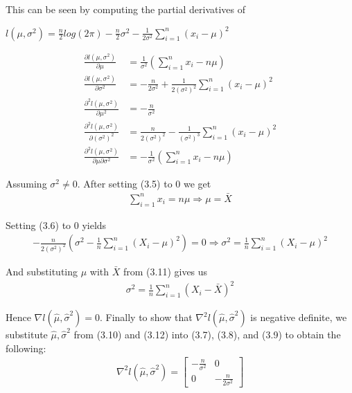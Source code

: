 \documentclass[paper=a4, fontsize=11pt]{scrartcl} %
\numberwithin{equation}{section} %
\numberwithin{figure}{section} %
\numberwithin{table}{section} %
\begin{document}
This can be seen by computing the partial derivatives of 

$ l(\mu, \sigma^2) = \frac{n}{2}log(2\pi)-\frac{n}{2}\sigma^2-\frac{1}{2\sigma^2}\sum_{i=1}^{n}(x_i-\mu)^2$

\begin{align}
\frac{\partial l(\mu, \sigma^2)}{\partial \mu} &= \frac{1}{\sigma^2}\left(\sum_{i=1}^{n}x_i-n\mu\right) \\
\frac{\partial l(\mu, \sigma^2)}{\partial \sigma^2} &= -\frac{n}{2\sigma^2}+\frac{1}{2(\sigma^2)^2}\sum_{i=1}^{n}\left(x_i-\mu\right)^2\\
\frac{\partial^2 l(\mu, \sigma^2)}{\partial \mu^2} &= -\frac{n}{\sigma^2}\\
\frac{\partial^2 l(\mu, \sigma^2)}{\partial (\sigma^2)^2} &= \frac{n}{2(\sigma^2)^2}-\frac{1}{(\sigma^2)^3}\sum_{i=1}^{n}\left(x_i-\mu\right)^2\\
\frac{\partial^2 l(\mu, \sigma^2)}{\partial \mu \partial \sigma^2} &= -\frac{1}{\sigma^2}\left(\sum_{i=1}^{n}x_i-n\mu\right)
\end{align}

Assuming $\sigma^2 \ne 0$. After setting (3.5) to 0 we get
\begin{align}
\sum_{i=1}^{n}x_i=n\mu \Rightarrow \mu = \bar{X}
\end{align}

Setting (3.6) to 0 yields
\begin{align}
-\frac{n}{2(\sigma^2)^2}\left(\sigma^2-\frac{1}{n}\sum_{i=1}^{n}\left(X_i-\mu\right)^2 \right) = 0  
 \Rightarrow \sigma^2 = \frac{1}{n}\sum_{i=1}^{n}\left(X_i-\mu\right)^2
\end{align}

And substituting $\mu$ with $\bar{X}$ from (3.11) gives us 
\begin{align}
\sigma^2 = \frac{1}{n}\sum_{i=1}^{n}\left(X_i-\bar{X}\right)^2
\end{align}

Hence $\nabla l(\hat{\mu}, \hat{\sigma}^2) = 0$. Finally to show that $\nabla^2 l(\hat{\mu}, \hat{\sigma}^2)$ is negative definite, we substitute $\hat{\mu}, \hat{\sigma}^2$ from (3.10) and (3.12) into (3.7), (3.8), and (3.9) to obtain the following:
\begin{align*}
\nabla^2 l(\hat{\mu}, \hat{\sigma}^2) = \begin{bmatrix}
-\frac{n}{\sigma^2}   &    0 \\
0                     &    -\frac{n}{2\sigma^2}
\end{bmatrix}
\end{align*}
\end{document}
